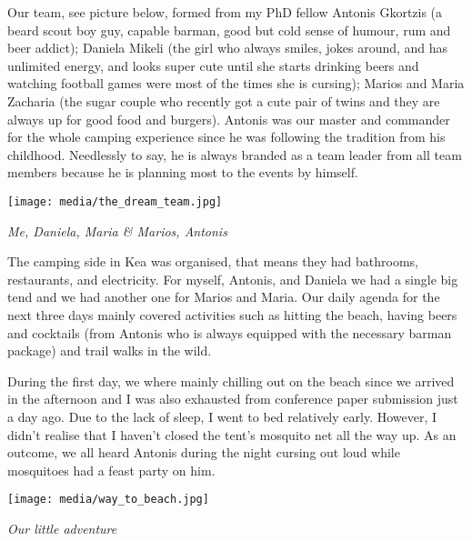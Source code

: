 \documentclass[10pt,a4paper]{article} %
\begin{document}
\begin{multicols}{3}
Our team, see picture below, formed from my PhD fellow Antonis Gkortzis
(a beard scout boy guy, capable barman, good but cold sense of humour, rum and beer addict);
Daniela Mikeli (the girl who always smiles, jokes around, and has unlimited energy,
and looks super cute until she starts drinking beers and watching football games
were most of the times she is cursing);
Marios and Maria Zacharia (the sugar couple who recently got a cute pair of twins
and they are always up for good food and burgers).  
Antonis was our master and commander for the whole camping experience since
he was following the tradition from his childhood.
Needlessly to say, he is always branded as a team leader from all team members
because he is planning most to the events by himself. 

\begin{center}
	\texttt{[image: media/the\_dream\_team.jpg]}
	\par\textit{Me, Daniela, Maria \& Marios, Antonis}
\end{center}

The camping side in Kea was organised, that means they had bathrooms,
restaurants, and electricity. 
For myself, Antonis, and Daniela we had a single big tend
and we had another one for Marios and Maria. 
Our daily agenda for the next three days mainly covered activities
such as hitting the beach, having beers and cocktails
(from Antonis who is always equipped with the necessary barman package)
and trail walks in the wild.

During the first day, we where mainly chilling out on the beach
since we arrived in the afternoon and I was also exhausted
from conference paper submission just a day ago. 
Due to the lack of sleep, I went to bed relatively early. 
However, I didn't realise that I haven't closed the tent's mosquito net
all the way up.  
As an outcome, we all heard Antonis during the night cursing out loud
while mosquitoes had a feast party on him.  

\begin{center}
	\texttt{[image: media/way\_to\_beach.jpg]}
	\par\textit{Our little adventure}
\end{center}


\end{multicols}
\end{document}
